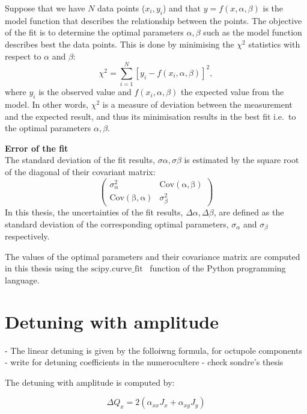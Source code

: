 Suppose that we have $N$ data points ($x_{i}, y_{i}$) and that $y=f(x,\alpha, \beta)$ is the model function that describes the relationship between the points. The objective of the fit is to determine the optimal parameters $\alpha, \beta$ such as the model function describes best the data points. This is done by minimising the $\chi^2$ statistics with respect to $\alpha$ and $\beta$:
\begin{equation}\label{eq:chi_square}
    \chi^2 = \sum_{i=1}^{N}[y_{i}-f(x_{i},\alpha, \beta)]^2,
\end{equation}
where $y_{i}$ is the observed value and $f(x_{i},\alpha, \beta)$ the expected value from the model. In other words, $\chi^2$ is a measure of deviation between the measurement and the expected result, and thus its minimisation results in the best fit i.e.\ to the optimal parameters $\alpha, \beta$.


\normalsize{\textbf{Error of the fit}}\\
The standard deviation of the fit results, $\sigma \alpha, \sigma \beta$ is estimated by the square root of the diagonal of their covariant matrix:
\begin{equation}\label{eq:cov_matrix_fit_results}
    \begin{pmatrix}
        \sigma_{\alpha}^2 & \mathrm{Cov(\alpha, \beta)}\\
        \mathrm{Cov(\beta, \alpha)} & \sigma_{\beta}^2
        \end{pmatrix}
\end{equation}
In this thesis, the uncertainties of the fit results, $\Delta \alpha, \Delta \beta$, are defined as the standard deviation of the corresponding optimal parameters, $\sigma_{\alpha}$ and  $\sigma_{\beta}$ respectively.

The values of the optimal parameters and their covariance matrix are computed in this thesis using the $\mathrm{scipy.curve \_ fit}$~\cite{scipy_curve_fit} function of the Python programming language.


\section{Detuning with amplitude}\label{app:detuning_with_amplitude}
- The linear detuning is given by the folloiwng formula, for octupole components
- write for detuning coefficients in the numerocultere
- check sondre's thesis

The detuning with amplitude is computed by:

\begin{equation}\label{eq:x_amplDetuning}
    \Delta Q_x = 2(\alpha_{xx}J_x + \alpha_{xy}J_y)
\end{equation}

